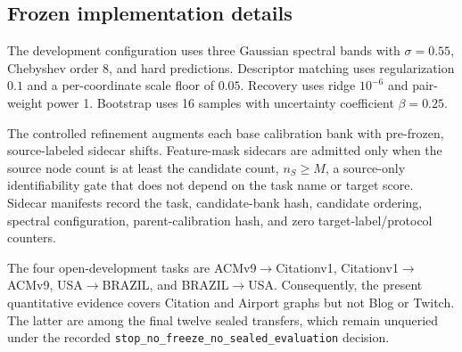 \subsection{Frozen implementation details}
\label{app:implementation}

The development configuration uses three Gaussian spectral bands with
$\sigma=0.55$, Chebyshev order 8, and hard predictions. Descriptor matching
uses regularization $0.1$ and a per-coordinate scale floor of $0.05$. Recovery
uses ridge $10^{-6}$ and pair-weight power 1. Bootstrap uses 16 samples with
uncertainty coefficient $\beta=0.25$.

The controlled refinement augments each base calibration bank with pre-frozen,
source-labeled sidecar shifts. Feature-mask sidecars are admitted only when
the source node count is at least the candidate count,
$n_S\geq M$, a source-only identifiability gate that does not depend on the
task name or target score. Sidecar manifests record the task, candidate-bank
hash, candidate ordering, spectral configuration, parent-calibration hash,
and zero target-label/protocol counters.

The four open-development tasks are ACMv9$\rightarrow$Citationv1,
Citationv1$\rightarrow$ACMv9, USA$\rightarrow$BRAZIL, and
BRAZIL$\rightarrow$USA. Consequently, the present quantitative evidence covers
Citation and Airport graphs but not Blog or Twitch. The latter are among the
final twelve sealed transfers, which remain unqueried under the recorded
\texttt{stop\_no\_freeze\_no\_sealed\_evaluation} decision.
